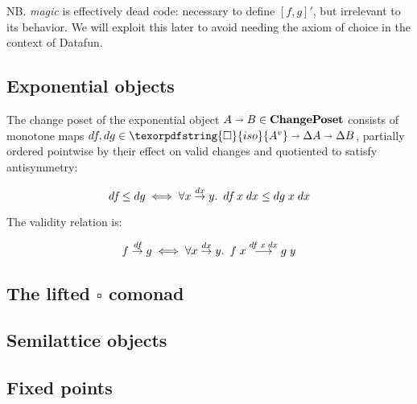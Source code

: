 \documentclass[nomarginums]{rntz}
\newcommand\cat\textbf
\newcommand\CP{\cat{ChangePoset}}
\newcommand\D\Delta
\newcommand\iso{\texorpdfstring{\ensuremath{\square}}{iso}}
\newcommand\isof[1]{\iso {#1}}
\newcommand\fname[1]{\textit{#1}}
\newcommand\validarrow{{\to}}
\newcommand\longvalidarrow{{\longrightarrow}}
\newcommand\valid[1]{\mathrel{\overset{#1}{\validarrow}}}
\newcommand\longvalid[1]{\mathrel{\overset{#1}{\longvalidarrow}}}
\newcommand\vals[1]{#1^v} %
\newcommand\chgs[1]{\D{#1}}
\newcommand\deriv[1]{#1'}
\newcommand\bindsp{~\,}
\newcommand\fa[1]{\forall #1.\bindsp}
\begin{document}
\noindent
NB. \fname{magic} is effectively dead code: necessary to define $\deriv{[f,g]}$,
but irrelevant to its behavior. We will exploit this later to avoid needing the
axiom of choice in the context of Datafun.


\subsection{Exponential objects}

\newcommand\expObj[2]{{#1} \shortrightarrow {#2}}
\newcommand\df{d\kern-0.1em f\kern-.1em}

The change poset of the exponential object $\expObj{A}{B} \in \CP$ consists of
monotone maps $\df, dg \in \expObj{\isof{\vals A}}{\expObj{\chgs A}{\chgs B}}$,
partially ordered pointwise by their effect on valid changes and quotiented to
satisfy antisymmetry:

\[ \df \le dg \iff \fa{x \valid{dx} y} \df \;x \;dx \le dg \;x \;dx \]

\noindent
The validity relation is:

\[ f \valid{\df} g \iff \fa{x \valid{dx} y} f\;x \longvalid{df \;x \;dx} g\;y
\]


\subsection{The lifted \iso{} comonad}

\subsection{Semilattice objects}

\subsection{Fixed points}
\end{document}
